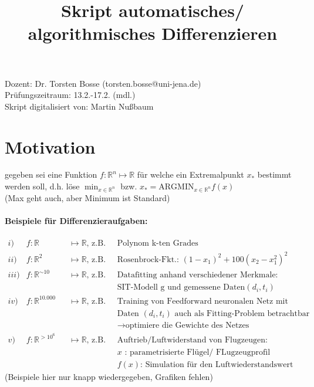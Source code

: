 \tableofcontents

\title{Skript automatisches/ algorithmisches Differenzieren}

\vspace{1cm}
\noindent Dozent: Dr. Torsten Bosse (torsten.bosse@uni-jena.de)\\
Prüfungszeitraum: 13.2.-17.2. (mdl.)\\
Skript digitalisiert von: Martin Nußbaum
\vspace{1cm}


\section{Motivation}
\label{chap:Motivation}


gegeben sei eine Funktion $f: \mathbb{R}^n \mapsto \mathbb{R}$ für welche ein Extremalpunkt $x_*$ bestimmt werden soll, d.h. löse
$\min_{x \in \mathbb{R}^n}$ bzw. $x_* = \text{ARGMIN}_{x \in \mathbb{R}^n} f(x)$\\
(Max geht auch, aber Minimum ist Standard)

\paragraph{Beispiele für Differenzieraufgaben:}
\begin{align*}
	i) & f:\mathbb{R} &&\mapsto \mathbb{R} \text{, z.B.} &&\text{Polynom k-ten Grades}
	\\
	ii) & f:\mathbb{R}^2 &&\mapsto \mathbb{R} \text{, z.B.} &&\text{Rosenbrock-Fkt.: } (1-x_1)^2 +100 (x_2-x_1^2)^2
	\\
	iii) & f:\mathbb{R}^{\sim10} &&\mapsto \mathbb{R} \text{, z.B.} &&\text{Datafitting anhand verschiedener Merkmale:}\\
	 & && &&\text{SIT-Modell g und gemessene Daten} (d_i,t_i)
	\\
	iv) & f:\mathbb{R}^{10.000} &&\mapsto \mathbb{R} \text{, z.B.} &&\text{Training von Feedforward neuronalen Netz mit den}\\
	 & && &&\text{Daten } (d_i, t_i) \text{ auch als Fitting-Problem betrachtbar}\\
	 & && &&\rightarrow\text{optimiere die Gewichte des Netzes}
	\\
	v) & f:\mathbb{R}^{>10^6} &&\mapsto \mathbb{R} \text{, z.B.} &&\text{Auftrieb/Luftwiderstand von Flugzeugen:}\\
	& && && x\text{  :  parametrisierte Flügel/ FLugzeugprofil}\\
	& && &&f(x)\text{: Simulation für den Luftwiederstandswert}
\end{align*}
(Beispiele hier nur knapp wiedergegeben, Grafiken fehlen)



